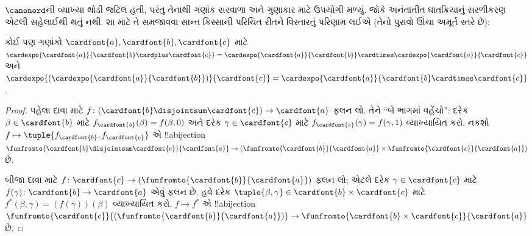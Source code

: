 \documentclass[../../../include/open-logic-section]{subfiles}
\begin{document}


$\canonord$ની વ્યાખ્યા થોડી જટિલ હતી, પરંતુ તેનાથી
ગણાંક સરવાળા અને ગુણાકાર માટે ઉપયોગી
 મળ્યું. જોકે અનંતાતીત
ઘાતક્રિયાનું સરળીકરણ એટલી સહેલાઈથી થતું નથી.
શા માટે તે સમજાવવા સાન્ત કિસ્સાની પરિચિત રીતને
વિસ્તારતું પરિણામ લઈએ (તેનો પુરાવો ઊંચા અમૂર્ત
સ્તરે છે):

\begin{prop}
કોઈ પણ ગણાંકો $\cardfont{a}, \cardfont{b},
\cardfont{c}$ માટે
$\cardexpo{\cardfont{a}}{\cardfont{b} \cardplus \cardfont{c}} =
\cardexpo{\cardfont{a}}{\cardfont{b}} \cardtimes
\cardexpo{\cardfont{a}}{\cardfont{c}}$ અને
$\cardexpo{(\cardexpo{\cardfont{a}}{\cardfont{b}})}{\cardfont{c}} =
\cardexpo{\cardfont{a}}{\cardfont{b} \cardtimes \cardfont{c}}$.
\end{prop}

\begin{proof}
પહેલા દાવા માટે $f \colon
(\cardfont{b}\disjointsum\cardfont{c}) \to
\cardfont{a}$ ફલન લો. તેને ``બે ભાગમાં વહેંચો'':
દરેક $\beta \in \cardfont{b}$ માટે
$f_\cardfont{b}(\beta) = f(\beta, 0)$ અને દરેક
$\gamma \in \cardfont{c}$ માટે
$f_\cardfont{c}(\gamma) = f(\gamma, 1)$
વ્યાખ્યાયિત કરો. નકશો $f \mapsto
\tuple{f_{\cardfont{b}}, f_\cardfont{c}}$ એ
!!a{bijection}
$\funfromto{\cardfont{b} \disjointsum \cardfont{c}}{\cardfont{a}} \to
(\funfromto{\cardfont{b}}{\cardfont{a}} \times
\funfromto{\cardfont{c}}{\cardfont{a}})$ છે.

બીજા દાવા માટે $f \colon \cardfont{c} \to
(\funfromto{\cardfont{b}}{\cardfont{a}})$ ફલન લો;
એટલે દરેક $\gamma \in \cardfont{c}$ માટે
$f(\gamma) \colon \cardfont{b} \to \cardfont{a}$
એવું ફલન છે. હવે દરેક
$\tuple{\beta, \gamma} \in \cardfont{b} \times
\cardfont{c}$ માટે
$f^*(\beta, \gamma) = (f(\gamma))(\beta)$
વ્યાખ્યાયિત કરો. $f \mapsto f^*$ એ
!!a{bijection}
$\funfromto{\cardfont{c}}{(\funfromto{\cardfont{b}}{\cardfont{a}})}
\to \funfromto{\cardfont{b} \times \cardfont{c}}{\cardfont{a}}$ છે.
\end{proof}

\end{document}
